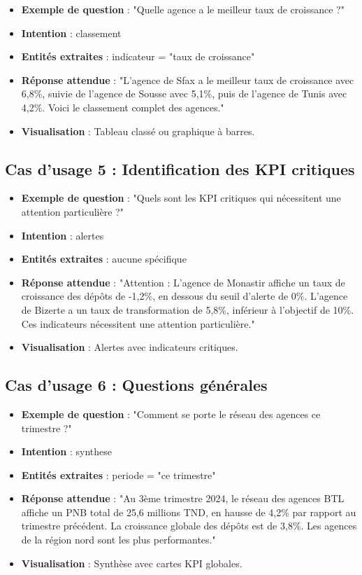 \begin{itemize}
    \item \textbf{Exemple de question} : "Quelle agence a le meilleur taux de croissance ?"
    \item \textbf{Intention} : classement
    \item \textbf{Entités extraites} : indicateur = "taux de croissance"
    \item \textbf{Réponse attendue} : "L'agence de Sfax a le meilleur taux de croissance avec 6,8\%, suivie de l'agence de Sousse avec 5,1\%, puis de l'agence de Tunis avec 4,2\%. Voici le classement complet des agences."
    \item \textbf{Visualisation} : Tableau classé ou graphique à barres.
\end{itemize}

\subsection{Cas d'usage 5 : Identification des KPI critiques}

\begin{itemize}
    \item \textbf{Exemple de question} : "Quels sont les KPI critiques qui nécessitent une attention particulière ?"
    \item \textbf{Intention} : alertes
    \item \textbf{Entités extraites} : aucune spécifique
    \item \textbf{Réponse attendue} : "Attention : L'agence de Monastir affiche un taux de croissance des dépôts de -1,2\%, en dessous du seuil d'alerte de 0\%. L'agence de Bizerte a un taux de transformation de 5,8\%, inférieur à l'objectif de 10\%. Ces indicateurs nécessitent une attention particulière."
    \item \textbf{Visualisation} : Alertes avec indicateurs critiques.
\end{itemize}

\subsection{Cas d'usage 6 : Questions générales}

\begin{itemize}
    \item \textbf{Exemple de question} : "Comment se porte le réseau des agences ce trimestre ?"
    \item \textbf{Intention} : synthese
    \item \textbf{Entités extraites} : periode = "ce trimestre"
    \item \textbf{Réponse attendue} : "Au 3ème trimestre 2024, le réseau des agences BTL affiche un PNB total de 25,6 millions TND, en hausse de 4,2\% par rapport au trimestre précédent. La croissance globale des dépôts est de 3,8\%. Les agences de la région nord sont les plus performantes."
    \item \textbf{Visualisation} : Synthèse avec cartes KPI globales.
\end{itemize}


